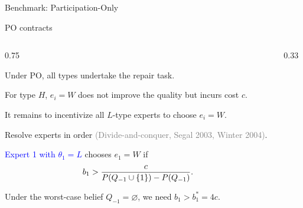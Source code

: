 \documentclass[10pt,aspectratio=169, compressed]{beamer}
\begin{document}

\begin{frame}
\centering
\vfill
{\large Benchmark: Participation-Only}
\vfill
\end{frame}







\begin{frame}[t]{PO contracts}

\begin{columns}[T,onlytextwidth]

    \begin{column}{0.75\textwidth}

    Under PO, all types undertake the repair task.
       \smallskip
    
    For type $H$, $e_i = W$ does not improve the quality but incurs cost $c$.
    
              \bigskip
       
       It remains to incentivize all $L$-type experts to choose $e_i = W$.

	\smallskip
	
	Resolve experts in order \textcolor{gray}{\small (Divide-and-conquer, Segal 2003, Winter 2004)}.

	\bigskip
	

\textcolor{blue}{Expert 1 with $\theta_1\! = \! L$} chooses $e_1 = W$ if
{\small$$
b_1 > {c \over P(Q_{-1} \cup \{1\}) - P(Q_{-1}) }.
$$
}

Under the worst-case belief $Q_{-1} = \varnothing$, we need
$b_1 > b_1^* = 4c$.


    \end{column}

    \begin{column}{0.33\textwidth}
        \centering
        \setlength{\tabcolsep}{8pt}
        \renewcommand{\arraystretch}{1.2}
\\[5pt]
\\[15pt]


\end{column}
\end{columns}
\end{frame}
\end{document}
